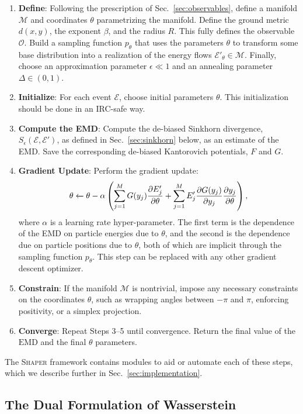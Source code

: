 \documentclass[letterpaper,11pt]{article}
\newcommand{\E}{\mathcal{E}}
\newcommand{\M}{\mathcal{M}}
\newcommand{\EMD}{\text{EMD}}
\renewcommand{\O}{\mathcal{O}}
\DeclareRobustCommand{\Sec}[1]{Sec.~\ref{sec:#1}}
\newcommand{\Shaper}{\textsc{Shaper}\xspace}
\begin{document}
\begin{enumerate}
    \item \textbf{Define}: Following the prescription of \Sec{observables}, define a manifold $\M$ and coordinates $\theta$ parametrizing the manifold. Define the ground metric $d(x,y)$, the exponent $\beta$, and the radius $R$. This fully defines the observable $\O$. Build a sampling function $p_\theta$ that uses the parameters $\theta$ to transform some base distribution into a realization of the energy flows $\E'_\theta \in \M$. Finally, choose an approximation parameter $\epsilon \ll 1$ and an annealing parameter $\Delta \in (0, 1)$.
    \item \textbf{Initialize}: For each event $\E$, choose initial parameters $\theta$. This initialization should be done in an IRC-safe way. 
    \item \textbf{Compute the EMD}: Compute the de-biased Sinkhorn divergence, $S_\epsilon(\E,\E')$, as defined in \Sec{sinkhorn} below, as an estimate of the EMD. Save the corresponding de-biased Kantorovich potentials, $F$ and $G$. 
    \item \textbf{Gradient Update}: Perform the gradient update:
    \begin{align}
        \theta \xleftarrow{} \theta - \alpha \left(\sum_{j=1}^M G(y_j)\pdv{E'_j}{\theta} + \sum_{j=1}^ME'_j\pdv{G(y_j)}{y_j}\pdv{y_j}{\theta} \right),
    \end{align}
    where $\alpha$ is a learning rate hyper-parameter. The first term is the dependence of the EMD on particle energies due to $\theta$, and the second is the dependence due on particle positions due to $\theta$, both of which are implicit through the sampling function $p_\theta$. This step can be replaced with any other gradient descent optimizer.
    \item \textbf{Constrain}: If the manifold $\M$ is nontrivial, impose any necessary constraints on the coordinates $\theta$, such as wrapping angles between $-\pi$ and $\pi$, enforcing positivity, or a simplex projection. 
    \item \textbf{Converge}: Repeat Steps 3--5 until convergence. Return the final value of the $\EMD$ and the final $\theta$ parameters. 
\end{enumerate}
The \Shaper framework contains modules to aid or automate each of these steps, which we describe further in \Sec{implementation}. 


\subsection{The Dual Formulation of Wasserstein}
\end{document}
